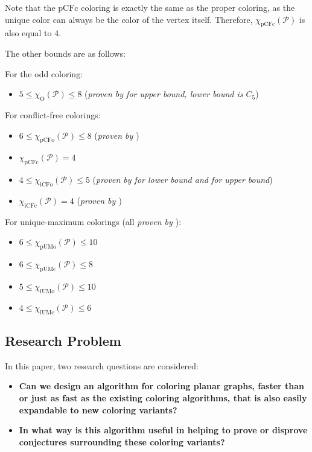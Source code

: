 \documentclass{article}
\begin{document}
Note that the $\mathrm{pCFc}$ coloring is exactly the same as the proper coloring, as the unique color can always be the color of the vertex itself. Therefore, $\chi_{\mathrm{pCFc}}(\mathcal{P})$ is also equal to $4$.

The other bounds are as follows:

For the odd coloring:
\begin{itemize}
	\item $5 \leq \chi_{\mathrm{O}}(\mathcal{P}) \leq 8$ (\textit{proven by \cite{petr2023odd} for upper bound, lower bound is $\mathit{C_5}$})
\end{itemize}

For conflict-free colorings:
\begin{itemize}
	\item $6 \leq \chi_{\mathrm{pCFo}}(\mathcal{P}) \leq 8$ (\textit{proven by \cite{fabrici2023proper}})
	\item $\chi_{\mathrm{pCFc}}(\mathcal{P}) = 4$
	\item $4 \le \chi_{\mathrm{iCFo}}(\mathcal{P}) \le 5$ (\textit{proven by \cite{abel2018conflict} for lower bound and \cite{huang2020short} for upper bound})
	\item $\chi_{\mathrm{iCFc}}(\mathcal{P}) = 4$ (\textit{proven by \cite{Malik2023thesis}})
\end{itemize}

For unique-maximum colorings (all \textit{proven by \cite{fabrici2023proper}}):
\begin{itemize}
	\item $6 \leq \chi_{\mathrm{pUMo}}(\mathcal{P}) \leq 10$
	\item $6 \leq \chi_{\mathrm{pUMc}}(\mathcal{P}) \leq 8$
	\item $5 \le \chi_{\mathrm{iUMo}}(\mathcal{P}) \le 10$
	\item $4 \le \chi_{\mathrm{iUMc}}(\mathcal{P}) \le 6$
\end{itemize}








\subsection{Research Problem}

In this paper, two research questions are considered:

\begin{itemize}
	\item \textbf{Can we design an algorithm for coloring planar graphs, faster than or just as fast as the existing coloring algorithms, that is also easily expandable to new coloring variants?}
	\item \textbf{In what way is this algorithm useful in helping to prove or disprove conjectures surrounding these coloring variants?}
\end{itemize}
\end{document}
